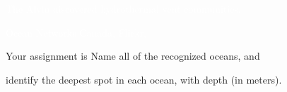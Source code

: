 \documentclass[t]{beamer}
\begin{document}

{
\begin{frame}[b]{\textcolor{white}{The Alvin discovered hydrothermal vent communities.}}

\hfill \tiny \textcolor{white}{Ocean Networks Canada, Flickr, }
\end{frame}
}



{
\begin{frame}[t]
\end{frame}
}

{
\begin{frame}[t]
\end{frame}
}

{
\begin{frame}[t]
\end{frame}
}



\begin{frame}[t]{Your  assignment is}
	\hangpara Name all of the recognized oceans, and

	\hangpara identify the deepest spot in each ocean, with depth (in meters).
\end{frame}
\end{document}
